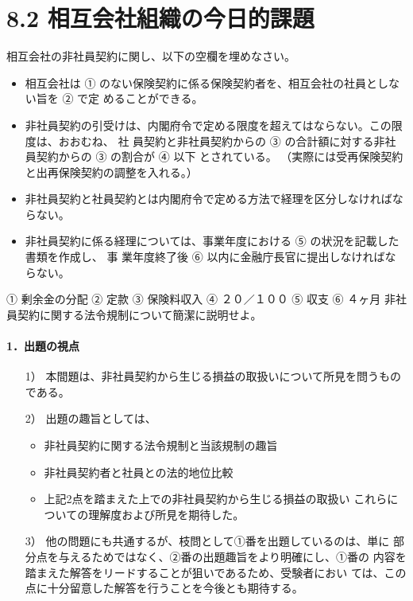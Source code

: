 \documentclass[report,gutter=10mm,fore-edge=10mm,uplatex,dvipdfmx]{jlreq}
\begin{document}
\section{8.2 相互会社組織の今日的課題}
相互会社の非社員契約に関し、以下の空欄を埋めなさい。
\begin{itemize}
 \item 相互会社は ① のない保険契約に係る保険契約者を、相互会社の社員としない旨を
 ② で定 めることができる。
 \item  非社員契約の引受けは、内閣府令で定める限度を超えてはならない。この限度は、おおむね、
社 員契約と非社員契約からの ③
 の合計額に対する非社員契約からの ③ の割合が ④ 以下 とされている。
 （実際には受再保険契約と出再保険契約の調整を入れる。）
 \item  非社員契約と社員契約とは内閣府令で定める方法で経理を区分しなければならない。
 \item  非社員契約に係る経理については、事業年度における ⑤ の状況を記載した書類を作成し、
事 業年度終了後 ⑥ 以内に金融庁長官に提出しなければならない。
\end{itemize}
① 剰余金の分配 ② 定款 ③ 保険料収入 ④ ２０／１００ ⑤ 収支 ⑥ ４ヶ月
非社員契約に関する法令規制について簡潔に説明せよ。
\paragraph{1．出題の視点}
\begin{enumerate}
 \item [1）]本間題は、非社員契約から生じる損益の取扱いについて所見を問うもの
 である。
 \item [2）]出題の趣旨としては、
\begin{itemize}
 \item  非社員契約に関する法令規制と当該規制の趣旨
 \item 非社員契約者と社員との法的地位比較
 \item 上記2点を踏まえた上での非社員契約から生じる損益の取扱い
 これらについての理解度および所見を期待した。
\end{itemize} 
 \item [3）]他の問題にも共通するが、枝問として①番を出題しているのは、単に
 部分点を与えるためではなく、②番の出題趣旨をより明確にし、①番の
 内容を踏まえた解答をリードすることが狙いであるため、受験者におい
 ては、この点に十分留意した解答を行うことを今後とも期待する。
\end{enumerate}
\end{document}
